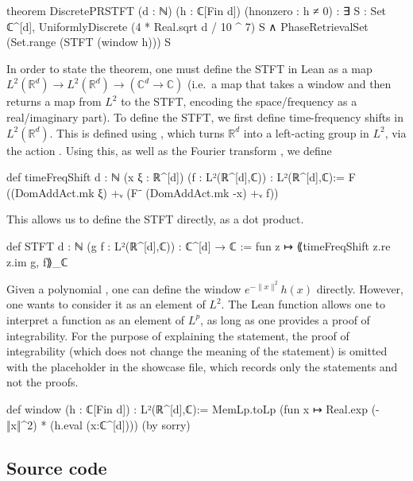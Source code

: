 \documentclass[11pt]{amsart}
\begin{document}
\begin{leancode}
theorem DiscretePRSTFT
    (d : ℕ) (h : ℂ[Fin d]) (hnonzero : h ≠ 0) :
      ∃ S : Set ℂ^[d],
        UniformlyDiscrete (4 * Real.sqrt d / 10 ^ 7) S ∧
        PhaseRetrievalSet (Set.range (STFT (window h))) S 
\end{leancode}

 In order to state the theorem, one must define the STFT in Lean as a map $L^2(\mathbb R^d) \to L^2(\mathbb R^d) \to (\mathbb C^d \to \mathbb C)$ (i.e.~a map that takes a window and then returns a map from $L^2$ to the STFT, encoding the space/frequency as a real/imaginary part). To define the STFT, we first define time-frequency shifts in $L^2(\mathbb R^d)$. This is defined using , which turns $\mathbb R^d$ into a left-acting group in $L^2$, via the action . Using this, as well as the Fourier transform , we define

\begin{leancode}
def timeFreqShift {d : ℕ} (x ξ : ℝ^[d]) (f : L²(ℝ^[d],ℂ)) : L²(ℝ^[d],ℂ):=
    F ((DomAddAct.mk ξ) +ᵥ (F⁻ (DomAddAct.mk -x) +ᵥ f))
\end{leancode}

This allows us to define the STFT directly, as a dot product.

\begin{leancode}
def STFT {d : ℕ} (g f : L²(ℝ^[d],ℂ)) : ℂ^[d] → ℂ :=
    fun z ↦ ⟪timeFreqShift z.re z.im g, f⟫_ℂ
\end{leancode}


Given a polynomial , one can define the window $e^{-\|x\|^2} h(x)$ directly. However, one wants to consider it as an element of $L^2$. The Lean function  allows one to interpret a function as an element of $L^p$, as long as one provides a proof of integrability. For the purpose of explaining the  statement, the  proof of integrability (which does not change the meaning of the statement) is omitted with the placeholder  in the showcase file, which records only the statements and not the proofs.

\begin{leancode}
def window (h : ℂ[Fin d]) :  L²(ℝ^[d],ℂ):=
    MemLp.toLp 
      (fun x ↦ Real.exp (-‖x‖^2) * (h.eval (x:ℂ^[d]))) 
      (by sorry)
\end{leancode}


\subsection{Source code}
\end{document}
